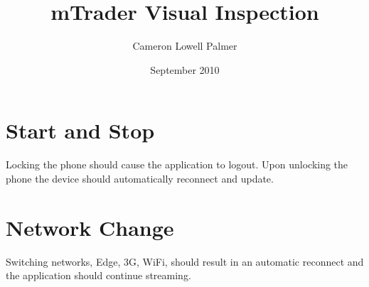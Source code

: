 \documentclass[12pt,twoside,letterpaper]{report}
\title{mTrader Visual Inspection}
\author{Cameron Lowell Palmer}
\date{September 2010}
\begin{document}
\maketitle

\section*{Start and Stop}
Locking the phone should cause the application to logout. Upon unlocking the phone the device should automatically reconnect and update.

\section*{Network Change}
Switching networks, Edge, 3G, WiFi, should result in an automatic reconnect and the application should continue streaming.
\end{document}
